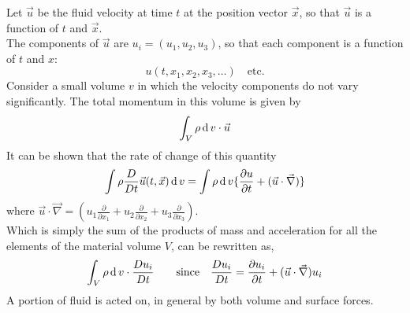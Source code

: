 \documentclass[../main-sheet.tex]{subfiles}
\begin{document}
\begin{soln}
    Let \(\vec{u}\) be the fluid velocity at time \(t\) at the position vector \(\vec{x}\), so that \(\vec{u}\) is a function of \(t\) and \(\vec{x}\).\\
    The components of \(\vec{u}\) are \(u_i=(u_1,u_2,u_3)\), so that each component is a function of \(t\) and \(x\):
    \[u(t,x_1,x_2,x_3,\dots)\quad\text{etc.}\]
    Consider a small volume \(v\) in which the velocity components do not vary significantly. The total momentum in this volume is given by
    \begin{equation}
        \int_V \rho \,\mathrm{d}\, v\cdot\vec{u}
        \label{eq:navTensor11}
    \end{equation}
    It can be shown that the rate of change of this quantity 
    \[\int \rho \frac{D}{D t}\vec{u}(t,\vec{x})\,\mathrm{d}\, v=\int \rho \,\mathrm{d}\, v \{\frac{\partial u}{\partial t}+(\vec{u}\cdot \vec{\nabla})\}\]
    where \(\vec{u}\cdot\vec{\nabla}=(u_1\frac{\partial}{\partial x_1}+u_2\frac{\partial}{\partial x_2}+u_3\frac{\partial}{\partial x_3})\).\\
    Which is simply the sum of the products of mass and acceleration for all the elements of the material volume \(V\), can be rewritten as,
    \[\int_V \rho \,\mathrm{d}\, v\cdot\frac{D u_i}{D t}\qquad \text{since}\quad\frac{D u_i}{D t}=\frac{\partial u_i}{\partial t}+(\vec{u}\cdot\vec{\nabla})u_i\]
    A portion of fluid is acted on, in general by both volume and surface forces.


\end{soln}
\end{document}
